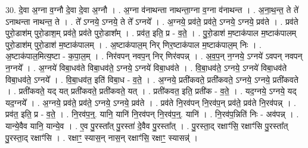 \documentclass[17pt]{extarticle}
\begin{document}
30. दे॒वा अ॒ग्ना व॒ग्नौ दे॒वा दे॒वा अ॒ग्नौ । . अ॒ग्ना व॑नाथन्ता नाथन्ता॒ग्ना व॒ग्ना व॑नाथन्त । . अ॒ना॒थ॒न्त॒ ते ते॑ ऽनाथन्ता नाथन्त॒ ते । . ते᳚ ऽग्नये॒ ऽग्नये॒ ते ते᳚ ऽग्नये᳚ । . अ॒ग्नये॒ प्रव॑ते॒ प्रव॑ते॒ ऽग्नये॒ ऽग्नये॒ प्रव॑ते । . प्रव॑ते पुरो॒डाश॑म् पुरो॒डाश॒म् प्रव॑ते॒ प्रव॑ते पुरो॒डाश᳚म् । . प्रव॑त॒ इति॒ प्र - व॒ते॒ । . पु॒रो॒डाश॑ म॒ष्टाक॑पाल म॒ष्टाक॑पालम् पुरो॒डाश॑म् पुरो॒डाश॑ म॒ष्टाक॑पालम् । . अ॒ष्टाक॑पाल॒म् निर् णिर॒ष्टाक॑पाल म॒ष्टाक॑पाल॒म् निः । . अ॒ष्टाक॑पाल॒मित्य॒ष्टा - क॒पा॒ल॒म् । . निर॑वपन् नवप॒न् निर् णिर॑वपन्न् । . अ॒व॒प॒न् न॒ग्नये॒ ऽग्नये॑ ऽवपन् नवपन् न॒ग्नये᳚ । . अ॒ग्नये॑ विबा॒धव॑ते विबा॒धव॑ते॒ ऽग्नये॒ ऽग्नये॑ विबा॒धव॑ते । . वि॒बा॒धव॑ते॒ ऽग्नये॒ ऽग्नये॑ विबा॒धव॑ते विबा॒धव॑ते॒ ऽग्नये᳚ । . वि॒बा॒धव॑त॒ इति॑ विबा॒ध - व॒ते॒ । . अ॒ग्नये॒ प्रती॑कवते॒ प्रती॑कवते॒ ऽग्नये॒ ऽग्नये॒ प्रती॑कवते । . प्रती॑कवते॒ यद् यत् प्रती॑कवते॒ प्रती॑कवते॒ यत् । . प्रती॑कवत॒ इति॒ प्रती॑क - व॒ते॒ । . यद॒ग्नये॒ ऽग्नये॒ यद् यद॒ग्नये᳚ । . अ॒ग्नये॒ प्रव॑ते॒ प्रव॑ते॒ ऽग्नये॒ ऽग्नये॒ प्रव॑ते । . प्रव॑ते नि॒रव॑पन् नि॒रव॑प॒न् प्रव॑ते॒ प्रव॑ते नि॒रव॑पन्न् । . प्रव॑त॒ इति॒ प्र - व॒ते॒ । . नि॒रव॑प॒न्॒. यानि॒ यानि॑ नि॒रव॑पन् नि॒रव॑प॒न्॒. यानि॑ । . नि॒रव॑प॒न्निति॑ निः - अव॑पन्न् । . यान्ये॒वैव यानि॒ यान्ये॒व । . ए॒व पु॒रस्ता᳚त् पु॒रस्ता॑ दे॒वैव पु॒रस्ता᳚त् । . पु॒रस्ता॒द् रक्षाꣳ॑सि॒ रक्षाꣳ॑सि पु॒रस्ता᳚त् पु॒रस्ता॒द् रक्षाꣳ॑सि । . रक्षाꣳ॒॒ स्यास॒न् नास॒न् रक्षाꣳ॑सि॒ रक्षाꣳ॒॒ स्यासन्न्॑ । \newline
\end{document}
